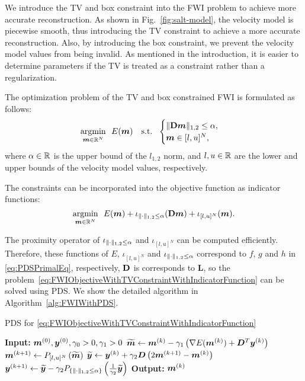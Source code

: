 We introduce the TV and box constraint into the FWI problem to achieve more accurate reconstruction.
As shown in Fig.~\ref{fig:salt-model}, the velocity model is piecewise smooth, thus introducing the TV constraint to achieve a more accurate reconstruction.
Also, by introducing the box constraint, we prevent the velocity model values from being invalid.
As mentioned in the introduction, it is easier to determine parameters if the TV is treated as a constraint rather than a regularization.

The optimization problem of the TV and box constrained FWI is formulated as follows:
\begin{equation} \label{eq:FWIObjectiveWithTVConstraint} \argmin{\velModel \in \realNumber^N} \ \ \FWIObjectiveWithTVConstraint \end{equation}
where $\alpha \in \mathbb{R}$ is the upper bound of the $l_{1,2}$ norm, and $l, u \in \mathbb{R}$ are the lower and upper bounds of the velocity model values, respectively.

The constraints can be incorporated into the objective function as indicator functions:
\begin{equation} \label{eq:FWIObjectiveWithTVConstraintWithIndicatorFunction} \argmin{\velModel \in \realNumber^N} \ \ \FWIObjectiveWithTVConstraintWithIndicatorFunction. \end{equation}

The proximity operator of $\iota_{\lVert \cdot \rVert _{1,2} \le \alpha}$ and $\iota_{[l,u]^N}$ can be computed efficiently.
Therefore, these functions of $E$, $\iota_{[l,u]^N}$ and $\iota_{\lVert \cdot \rVert _{1,2} \le \alpha}$ correspond to $f$, $g$ and $h$ in \eqref{eq:PDSPrimalEq}, respectively, $\mathbf{D}$ is corresponds to $\bm{L}$, so the problem~\eqref{eq:FWIObjectiveWithTVConstraintWithIndicatorFunction} can be solved using PDS.
We show the detailed algorithm in Algorithm~\ref{alg:FWIWithPDS}.
\begin{algorithm}[t]
    \caption{PDS for \eqref{eq:FWIObjectiveWithTVConstraintWithIndicatorFunction}}\label{alg:FWIWithPDS}
    \begin{algorithmic}[1]
        \Statex \textbf{Input:} $ \bm{m}^{(0)}, \bm{y}^{(0)}, \gamma_0 > 0, \gamma_1 > 0 $
            \State $\widetilde{\bm{m}} \leftarrow \bm{m}^{(k)} - \gamma_1 \left( \nabla E(\bm{m}^{(k)}) + \bm{D}^T \bm{y}^{(k)} \right) $
            \State $\bm{m}^{(k+1)}     \leftarrow P_{[l,u]^N} \left( \widetilde{\bm{m}} \right) $
            \State $\widetilde{\bm{y}}     \leftarrow \bm{y}^{(k)} + \gamma_2 \bm{D} \left( 2\bm{m}^{(k+1)} - \bm{m}^{(k)} \right) $
            \State $\bm{y}^{(k+1)}         \leftarrow \widetilde{\bm{y}} - \gamma_2 P_{ \{ \lVert  \cdot  \rVert _{1,2} \le \alpha \} }\left(\frac 1 {\gamma_2} {\widetilde{\bm y}}\right) $
        \EndWhile
        \Statex \textbf{Output:} $\bm{m}^{(k)}$
    \end{algorithmic}
\end{algorithm}


